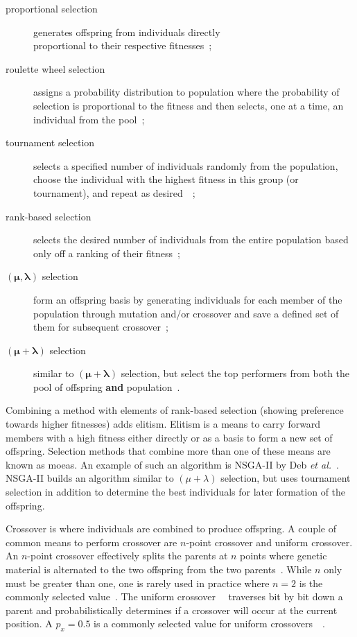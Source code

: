 \begin{description}
\item[proportional selection] generates offspring from individuals directly \\ proportional to their respective fitnesses~\cite{Holland1975-di};
\item[roulette wheel selection] assigns a probability distribution to population where the probability of selection is proportional to the fitness and then selects, one at a time, an individual from the pool~\cite{Baeck2000-co};
\item[tournament selection] selects a specified number of individuals randomly from the population, choose the individual with the highest fitness in this group (or tournament), and repeat as desired~\cite{Brindle1981-rh}~\cite{Goldberg1991-kr};
\item[rank-based selection] selects the desired number of individuals from the entire population based only off a ranking of their fitness~\cite{Baker1985-fw};
\item[$\bm{(\mu, \lambda)}$ selection] form an offspring basis by generating individuals for each member of the population through mutation and/or crossover and save a defined set of them for subsequent crossover~\cite{Schwefel1976-er};
\item[$\bm{(\mu + \lambda)}$ selection] similar to $\bm{(\mu + \lambda)}$ selection, but select the top performers from both the pool of offspring \textbf{and} population~\cite{Schwefel1976-er}.
\end{description}

Combining a method with elements of rank-based selection (showing preference towards higher fitnesses) adds elitism. Elitism is a means to carry forward  members with a high fitness either directly or as a basis to form a new set of offspring. Selection methods that combine more than one of these means are known as \glspl{moea}. An example of such an algorithm is NSGA-II by Deb \textit{et al.}~\cite{Deb2000-so}. NSGA-II builds an algorithm similar to $(\mu + \lambda)$ selection, but uses tournament selection in addition to determine the best individuals for later formation of the offspring.

Crossover is where individuals are combined to produce offspring. A couple of common means to perform crossover are $n$-point crossover and uniform crossover. An $n$-point crossover effectively splits the parents at $n$ points where genetic material is alternated to the two offspring from the two parents~\cite{De_Jong1975-wc}. While $n$ only must be greater than one, one is rarely used in practice where $n = 2$ is the commonly selected value~\cite{Baeck2000-co}. The uniform crossover~\cite{Ackley1987-xa}~\cite{Syswerda1989-go} traverses bit by bit down a parent and probabilistically determines if a crossover will occur at the current position. A $p_x = 0.5$ is a commonly selected value for uniform crossovers~\cite{Baeck2000-co}~\cite{Ackley1987-xa}.

